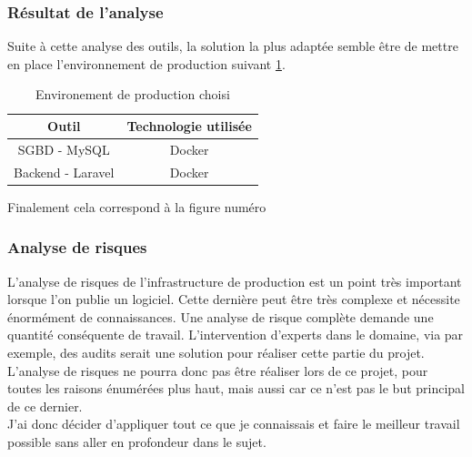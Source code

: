 \documentclass[
    iai, %
    il, %
]{heig-tb}
\begin{document}

\subsubsection{Résultat de l'analyse}
Suite à cette analyse des outils, la solution la plus adaptée semble être de mettre en place
l'environnement de production suivant \ref{env-prod}.

\begin{table}[h]
    \begin{center}
        \caption{Environement de production choisi \label{env-prod}}
        \begin{tabular}{c|c}
            Outil             & Technologie utilisée \\ \hline
            SGBD - MySQL      & Docker               \\
            Backend - Laravel & Docker               \\
        \end{tabular}
    \end{center}
\end{table}

Finalement cela correspond à la figure numéro %

\subsubsection{Analyse de risques}

L'analyse de risques de l'infrastructure de production est un point très important lorsque l'on publie un logiciel. Cette dernière peut être très complexe et nécessite énormément de connaissances.
Une analyse de risque complète demande une quantité conséquente de travail. L'intervention d'experts dans le domaine, via par exemple, des audits serait une solution pour réaliser cette partie du projet.\\
L'analyse de risques ne pourra donc pas être réaliser lors de ce projet, pour toutes les raisons énumérées plus haut, mais aussi car ce n'est pas le but principal de ce dernier.\\
J'ai donc décider d'appliquer tout ce que je connaissais et faire le meilleur travail possible sans aller en profondeur dans le sujet.
\end{document}
